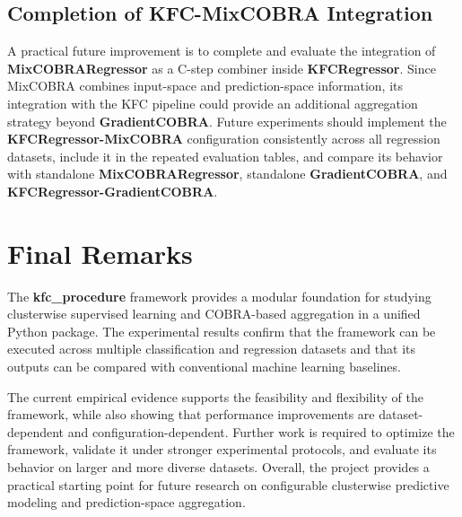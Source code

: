 \subsection{Completion of KFC-MixCOBRA Integration}

\hs A practical future improvement is to complete and evaluate the integration of \textbf{MixCOBRARegressor} as a C-step combiner inside \textbf{KFCRegressor}. Since MixCOBRA combines input-space and prediction-space information, its integration with the KFC pipeline could provide an additional aggregation strategy beyond \textbf{GradientCOBRA}. Future experiments should implement the \textbf{KFCRegressor-MixCOBRA} configuration consistently across all regression datasets, include it in the repeated evaluation tables, and compare its behavior with standalone \textbf{MixCOBRARegressor}, standalone \textbf{GradientCOBRA}, and \textbf{KFCRegressor-GradientCOBRA}.

\section{Final Remarks}
\label{sec:final_remarks}

\hs The \textbf{kfc\_procedure} framework provides a modular foundation for studying clusterwise supervised learning and COBRA-based aggregation in a unified Python package. The experimental results confirm that the framework can be executed across multiple classification and regression datasets and that its outputs can be compared with conventional machine learning baselines.

The current empirical evidence supports the feasibility and flexibility of the framework, while also showing that performance improvements are dataset-dependent and configuration-dependent. Further work is required to optimize the framework, validate it under stronger experimental protocols, and evaluate its behavior on larger and more diverse datasets. Overall, the project provides a practical starting point for future research on configurable clusterwise predictive modeling and prediction-space aggregation.
